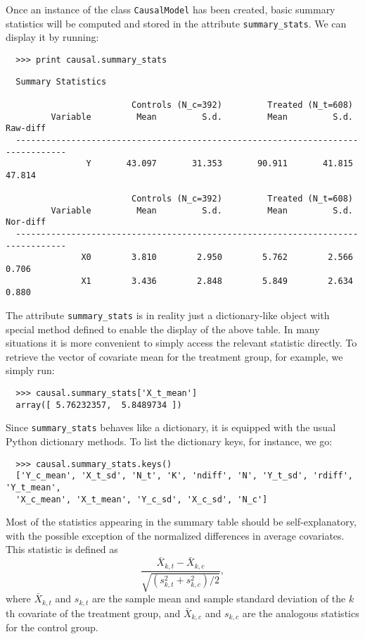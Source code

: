 \documentclass[12pt]{article}
\theoremstyle{definition}
\theoremstyle{definition}
\theoremstyle{definition}
\theoremstyle{remark}
\begin{document}
Once an instance of the class \texttt{CausalModel} has been created, basic summary statistics will be computed and stored in the attribute \texttt{summary\_stats}. We can display it by running:
\begin{verbatim}
  >>> print causal.summary_stats
\end{verbatim}
\begin{verbatim}
  Summary Statistics
  
                         Controls (N_c=392)         Treated (N_t=608)             
         Variable         Mean         S.d.         Mean         S.d.     Raw-diff
  --------------------------------------------------------------------------------
                Y       43.097       31.353       90.911       41.815       47.814
  
                         Controls (N_c=392)         Treated (N_t=608)             
         Variable         Mean         S.d.         Mean         S.d.     Nor-diff
  --------------------------------------------------------------------------------
               X0        3.810        2.950        5.762        2.566        0.706
               X1        3.436        2.848        5.849        2.634        0.880
\end{verbatim}

The attribute \texttt{summary\_stats} is in reality just a dictionary-like object with special method defined to enable the display of the above table. In many situations it is more convenient to simply access the relevant statistic directly. To retrieve the vector of covariate mean for the treatment group, for example, we simply run:
\begin{verbatim}
  >>> causal.summary_stats['X_t_mean']
  array([ 5.76232357,  5.8489734 ])
\end{verbatim}

Since \texttt{summary\_stats} behaves like a dictionary, it is equipped with the usual Python dictionary methods. To list the dictionary keys, for instance, we go:
\begin{verbatim}
  >>> causal.summary_stats.keys()
  ['Y_c_mean', 'X_t_sd', 'N_t', 'K', 'ndiff', 'N', 'Y_t_sd', 'rdiff', 'Y_t_mean',
  'X_c_mean', 'X_t_mean', 'Y_c_sd', 'X_c_sd', 'N_c']
\end{verbatim}

Most of the statistics appearing in the summary table should be self-explanatory, with the possible exception of the normalized differences in average covariates. This statistic is defined as
\[\frac{\bar{X}_{k,t} - \bar{X}_{k,c}}{\sqrt{\left(s^2_{k,t}+s^2_{k,c}\right)\Big/ 2}},\]
where $\bar{X}_{k,t}$ and $s_{k,t}$ are the sample mean and sample standard deviation of the $k$th covariate of the treatment group, and $\bar{X}_{k,c}$ and $s_{k,c}$ are the analogous statistics for the control group.
\end{document}
